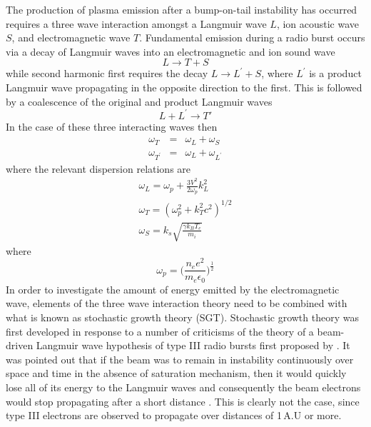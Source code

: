 The production of plasma emission after a bump-on-tail instability has occurred requires a three wave interaction amongst a Langmuir wave $L$, ion acoustic wave $S$, and electromagnetic wave $T$. Fundamental emission during a radio burst occurs via a decay of Langmuir waves into an electromagnetic and ion sound wave
\begin{equation}
L \rightarrow T + S
\label{eqn:fund}
\end{equation}
while second harmonic first requires the decay $L\rightarrow L^{'} + S$, where $L^{'}$ is a product Langmuir wave propagating in the opposite direction to the first. This is followed by a coalescence of the original and product Langmuir waves
\begin{equation}
L + L^{'}\rightarrow T'
\label{eqn:harm}
\end{equation}
In the case of these three interacting waves then 
\begin{eqnarray}
\omega_T & = & \omega_L + \omega_S \\
\omega_{T^{'}} & = & \omega_L + \omega_{L^{'}}
\end{eqnarray}
where the relevant dispersion relations are 
\begin{eqnarray}
\omega_L = \omega_p + \frac{3V^2}{2\omega_p}k_L^2 \\
\omega_T = (\omega_p^2 +k_T^2c^2)^{1/2} \\
\omega_S = k_s\sqrt{\frac{\gamma k_B T_e}{m_i}}
\end{eqnarray}
where
\begin{equation}
\omega_p = \bigg(\frac{n_e e^2}{m_e \epsilon_0}\bigg)^\frac{1}{2}
\label{eqn:plasma_frequency}
\end{equation}
In order to investigate the amount of energy emitted by the electromagnetic wave, elements of the three wave interaction theory need to be combined with what is known as stochastic growth theory \citep{robinson1993a}(SGT). Stochastic growth theory was first developed in response to a number of criticisms of the theory of a beam-driven Langmuir wave hypothesis of type III radio bursts first proposed by \citet{ginzburg1958}. It was pointed out that if the beam was to remain in instability continuously over space and time in the absence of saturation mechanism, then it would quickly lose all of its energy to the Langmuir waves and consequently the beam electrons would stop propagating after a short distance \citep{sturrock1964}. This is clearly not the case, since type III electrons are observed to propagate over distances of 1\,A.U or more. 
